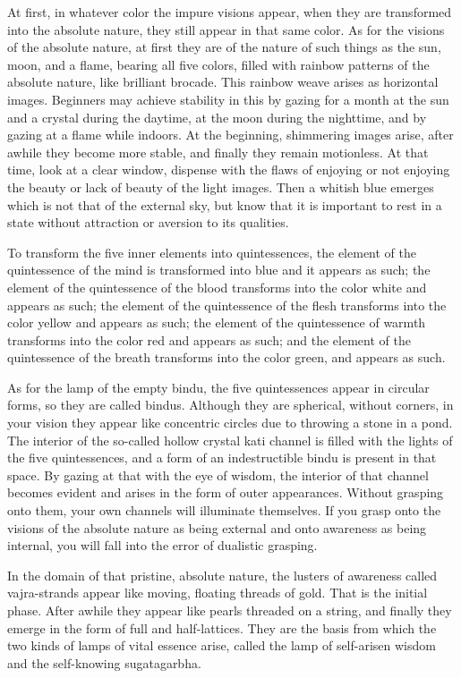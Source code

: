 \documentclass[11pt,twocolumn]{article}
\begin{document}
At first, in whatever color the impure visions appear, when they are
transformed into the absolute nature, they still appear in that same
color. As for the visions of the absolute nature, at first they are of
the nature of such things as the sun, moon, and a flame, bearing all
five colors, filled with rainbow patterns of the absolute nature, like
brilliant brocade. This rainbow weave arises as horizontal
images. Beginners may achieve stability in this by gazing for a month
at the sun and a crystal during the daytime, at the moon during the
nighttime, and by gazing at a flame while indoors. At the beginning,
shimmering images arise, after awhile they become more stable, and
finally they remain motionless. At that time, look at a clear window,
dispense with the flaws of enjoying or not enjoying the beauty or lack
of beauty of the light images. Then a whitish blue emerges which is
not that of the external sky, but know that it is important to rest in
a state without attraction or aversion to its qualities.

To transform the five inner elements into quintessences, the element
of the quintessence of the mind is transformed into blue and it
appears as such; the element of the quintessence of the blood
transforms into the color white and appears as such; the element of
the quintessence of the flesh transforms into the color yellow and
appears as such; the element of the quintessence of warmth transforms
into the color red and appears as such; and the element of the
quintessence of the breath transforms into the color green, and
appears as such.

As for the lamp of the empty bindu, the five quintessences appear in
circular forms, so they are called bindus. Although they are
spherical, without corners, in your vision they appear like concentric
circles due to throwing a stone in a pond. The interior of the
so\hyp{}called hollow crystal kati channel is filled with the lights
of the five quintessences, and a form of an indestructible bindu is
present in that space. By gazing at that with the eye of wisdom, the
interior of that channel becomes evident and arises in the form of
outer appearances. Without grasping onto them, your own channels will
illuminate themselves. If you grasp onto the visions of the absolute
nature as being external and onto awareness as being internal, you
will fall into the error of dualistic grasping.

In the domain of that pristine, absolute nature, the lusters of
awareness called vajra\hyp{}strands appear like moving, floating
threads of gold. That is the initial phase. After awhile they appear
like pearls threaded on a string, and finally they emerge in the form
of full and half\hyp{}lattices. They are the basis from which the two
kinds of lamps of vital essence arise, called the lamp of
self\hyp{}arisen wisdom and the self\hyp{}knowing sugatagarbha.
\end{document}
